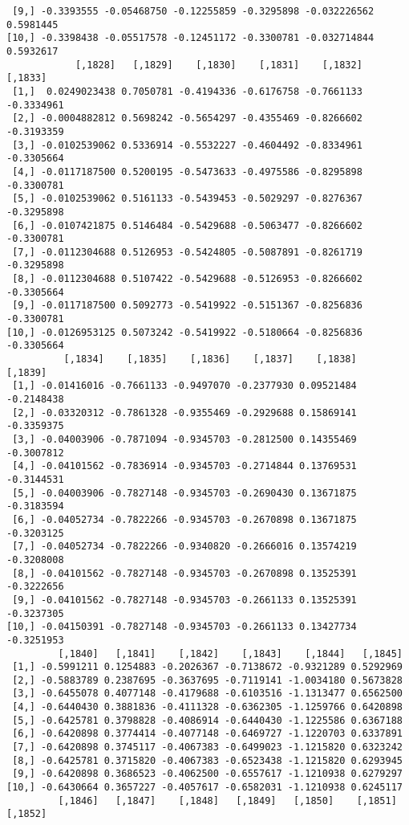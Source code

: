 \documentclass[
  letterpaper,
  DIV=11,
  numbers=noendperiod]{scrreprt}
\begin{document}
\begin{verbatim}
 [9,] -0.3393555 -0.05468750 -0.12255859 -0.3295898 -0.032226562 0.5981445
[10,] -0.3398438 -0.05517578 -0.12451172 -0.3300781 -0.032714844 0.5932617
            [,1828]   [,1829]    [,1830]    [,1831]    [,1832]    [,1833]
 [1,]  0.0249023438 0.7050781 -0.4194336 -0.6176758 -0.7661133 -0.3334961
 [2,] -0.0004882812 0.5698242 -0.5654297 -0.4355469 -0.8266602 -0.3193359
 [3,] -0.0102539062 0.5336914 -0.5532227 -0.4604492 -0.8334961 -0.3305664
 [4,] -0.0117187500 0.5200195 -0.5473633 -0.4975586 -0.8295898 -0.3300781
 [5,] -0.0102539062 0.5161133 -0.5439453 -0.5029297 -0.8276367 -0.3295898
 [6,] -0.0107421875 0.5146484 -0.5429688 -0.5063477 -0.8266602 -0.3300781
 [7,] -0.0112304688 0.5126953 -0.5424805 -0.5087891 -0.8261719 -0.3295898
 [8,] -0.0112304688 0.5107422 -0.5429688 -0.5126953 -0.8266602 -0.3305664
 [9,] -0.0117187500 0.5092773 -0.5419922 -0.5151367 -0.8256836 -0.3300781
[10,] -0.0126953125 0.5073242 -0.5419922 -0.5180664 -0.8256836 -0.3305664
          [,1834]    [,1835]    [,1836]    [,1837]    [,1838]    [,1839]
 [1,] -0.01416016 -0.7661133 -0.9497070 -0.2377930 0.09521484 -0.2148438
 [2,] -0.03320312 -0.7861328 -0.9355469 -0.2929688 0.15869141 -0.3359375
 [3,] -0.04003906 -0.7871094 -0.9345703 -0.2812500 0.14355469 -0.3007812
 [4,] -0.04101562 -0.7836914 -0.9345703 -0.2714844 0.13769531 -0.3144531
 [5,] -0.04003906 -0.7827148 -0.9345703 -0.2690430 0.13671875 -0.3183594
 [6,] -0.04052734 -0.7822266 -0.9345703 -0.2670898 0.13671875 -0.3203125
 [7,] -0.04052734 -0.7822266 -0.9340820 -0.2666016 0.13574219 -0.3208008
 [8,] -0.04101562 -0.7827148 -0.9345703 -0.2670898 0.13525391 -0.3222656
 [9,] -0.04101562 -0.7827148 -0.9345703 -0.2661133 0.13525391 -0.3237305
[10,] -0.04150391 -0.7827148 -0.9345703 -0.2661133 0.13427734 -0.3251953
         [,1840]   [,1841]    [,1842]    [,1843]    [,1844]   [,1845]
 [1,] -0.5991211 0.1254883 -0.2026367 -0.7138672 -0.9321289 0.5292969
 [2,] -0.5883789 0.2387695 -0.3637695 -0.7119141 -1.0034180 0.5673828
 [3,] -0.6455078 0.4077148 -0.4179688 -0.6103516 -1.1313477 0.6562500
 [4,] -0.6440430 0.3881836 -0.4111328 -0.6362305 -1.1259766 0.6420898
 [5,] -0.6425781 0.3798828 -0.4086914 -0.6440430 -1.1225586 0.6367188
 [6,] -0.6420898 0.3774414 -0.4077148 -0.6469727 -1.1220703 0.6337891
 [7,] -0.6420898 0.3745117 -0.4067383 -0.6499023 -1.1215820 0.6323242
 [8,] -0.6425781 0.3715820 -0.4067383 -0.6523438 -1.1215820 0.6293945
 [9,] -0.6420898 0.3686523 -0.4062500 -0.6557617 -1.1210938 0.6279297
[10,] -0.6430664 0.3657227 -0.4057617 -0.6582031 -1.1210938 0.6245117
         [,1846]   [,1847]    [,1848]   [,1849]   [,1850]    [,1851]    [,1852]

\end{verbatim}
\end{document}
